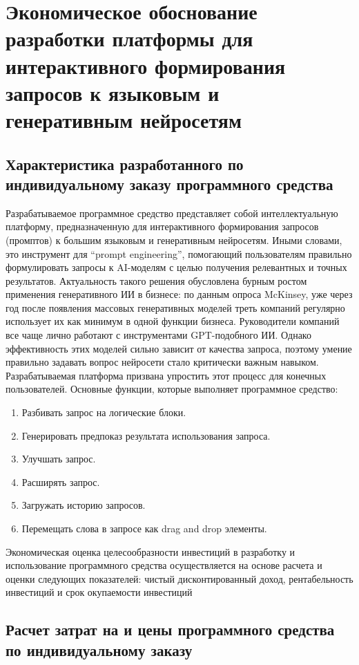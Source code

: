 \section{Экономическое обоснование разработки платформы для интерактивного формирования запросов к языковым и генеративным нейросетям}
\label{sec:economics}

\subsection{Характеристика разработанного по индивидуальному заказу  программного средства}
Разрабатываемое программное средство представляет собой интеллектуальную платформу, предназначенную для интерактивного формирования запросов (промптов) к большим языковым и генеративным нейросетям. Иными словами, это инструмент для “prompt engineering”, помогающий пользователям правильно формулировать запросы к AI-моделям с целью получения релевантных и точных результатов.
Актуальность такого решения обусловлена бурным ростом применения генеративного ИИ в бизнесе: по данным опроса McKinsey, уже через год после появления массовых генеративных моделей треть компаний регулярно использует их как минимум в одной функции бизнеса​.
Руководители компаний все чаще лично работают с инструментами GPT-подобного ИИ​.
Однако эффективность этих моделей сильно зависит от качества запроса, поэтому умение правильно задавать вопрос нейросети стало критически важным навыком​.
Разрабатываемая платформа призвана упростить этот процесс для конечных пользователей.
Основные функции, которые выполняет программное средство:
\begin{enumerate}[label=\arabic*]
	\item Разбивать запрос на логические блоки.
	\item Генерировать предпоказ результата использования запроса.
	\item Улучшать запрос.
	\item Расширять запрос.
	\item Загружать историю запросов.
	\item Перемещать слова в запросе как drag and drop элементы.
\end{enumerate}
Экономическая оценка целесообразности инвестиций в разработку и использование программного средства осуществляется на основе расчета и оценки следующих показателей: чистый дисконтированный доход, рентабельность инвестиций и срок окупаемости инвестиций

\subsection{Расчет затрат на 	 и цены программного средства по индивидуальному заказу}

